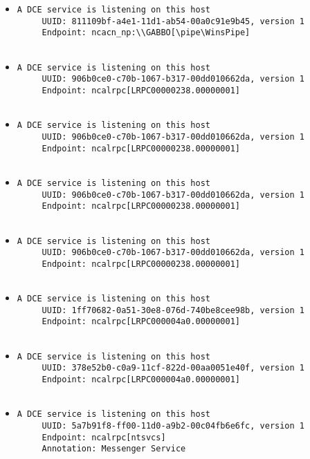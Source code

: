\documentclass{article}
\begin{document}
\begin{itemize}
\item \begin{verbatim}
A DCE service is listening on this host
     UUID: 811109bf-a4e1-11d1-ab54-00a0c91e9b45, version 1
     Endpoint: ncacn_np:\\GABBO[\pipe\WinsPipe]


\end{verbatim}\item \begin{verbatim}
A DCE service is listening on this host
     UUID: 906b0ce0-c70b-1067-b317-00dd010662da, version 1
     Endpoint: ncalrpc[LRPC00000238.00000001]


\end{verbatim}\item \begin{verbatim}
A DCE service is listening on this host
     UUID: 906b0ce0-c70b-1067-b317-00dd010662da, version 1
     Endpoint: ncalrpc[LRPC00000238.00000001]


\end{verbatim}\item \begin{verbatim}
A DCE service is listening on this host
     UUID: 906b0ce0-c70b-1067-b317-00dd010662da, version 1
     Endpoint: ncalrpc[LRPC00000238.00000001]


\end{verbatim}\item \begin{verbatim}
A DCE service is listening on this host
     UUID: 906b0ce0-c70b-1067-b317-00dd010662da, version 1
     Endpoint: ncalrpc[LRPC00000238.00000001]


\end{verbatim}\item \begin{verbatim}
A DCE service is listening on this host
     UUID: 1ff70682-0a51-30e8-076d-740be8cee98b, version 1
     Endpoint: ncalrpc[LRPC000004a0.00000001]


\end{verbatim}\item \begin{verbatim}
A DCE service is listening on this host
     UUID: 378e52b0-c0a9-11cf-822d-00aa0051e40f, version 1
     Endpoint: ncalrpc[LRPC000004a0.00000001]


\end{verbatim}\item \begin{verbatim}
A DCE service is listening on this host
     UUID: 5a7b91f8-ff00-11d0-a9b2-00c04fb6e6fc, version 1
     Endpoint: ncalrpc[ntsvcs]
     Annotation: Messenger Service



\end{verbatim}
\end{itemize}
\end{document}
